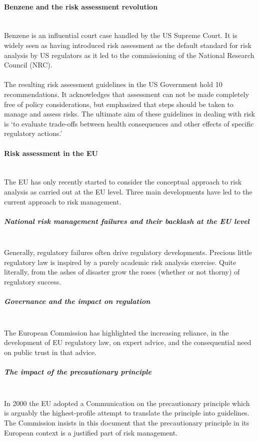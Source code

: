 \documentclass[../summary.tex]{subfiles}
\begin{document}
			\paragraph{Benzene and the risk assessment revolution}\mbox{}\\
				Benzene is an influential court case handled by the US Supreme Court. It is widely seen as having introduced risk assessment as the default standard for risk analysis by US regulators as it led to the commissioning of the National Research Council (NRC). \\
				\\
				The resulting risk assessment guidelines in the US Government hold 10 recommendations. It acknowledges that assessment can not be made completely free of policy considerations, but emphasized that steps should be taken to  manage and assess risks. The ultimate aim of these guidelines in dealing with risk is `to evaluate trade-offs between health consequences and other effects of specific regulatory actions.' 
				
			\paragraph{Risk assessment in the EU}\mbox{}\\
				The EU has only recently started to consider the conceptual approach to risk analysis as carried out at the EU level. Three main developments have led to the current approach to risk management. 
				
				\subparagraph{National risk management failures and their backlash at the EU level}\mbox{}\\
					Generally, regulatory failures often drive regulatory developments. Precious little regulatory law is inspired by a purely academic risk analysis exercise. Quite literally, from the ashes of disaster grow the roses (whether or not thorny) of regulatory success.
				
				\subparagraph{Governance and the impact on regulation}\mbox{}\\
					The European Commission has highlighted the increasing reliance, in the development of EU regulatory law, on expert advice, and the consequential need on public trust in that advice.
					
				\subparagraph{The impact of the precautionary principle}\mbox{}\\
					In 2000 the EU adopted a Communication on the precautionary principle which is arguably the highest-profile attempt to translate the principle into guidelines. The Commission insists in this document that the precautionary principle in its European context is a justified part of risk management.
					
\end{document}
